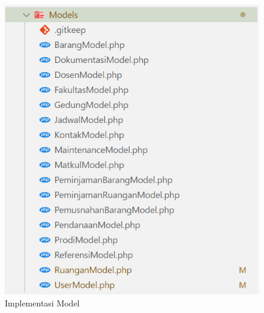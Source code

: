\begin{figure}
	\centering
	\includegraphics[width=0.82\linewidth]{konten//gambar/implementasi-folder/folder-model.png}
	\caption{Implementasi Model}
	\label{fig:implementasi-model}
\end{figure}

